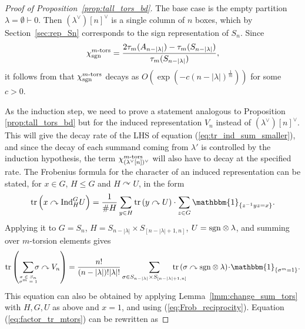 \documentclass{amsart}
\newcommand{\tn}{\textnormal}
\newcommand{\tr}{\operatorname{tr}}
\begin{document}
\begin{proof}[Proof of Proposition~\ref{prop:tall_tors_bd}]
The base case is the empty partition $\lambda=\emptyset\vdash0$. Then $(\lambda^\vee)[n]^\vee$ is a single column of $n$ boxes, which by Section~\ref{sec:rep_Sn} corresponds to the sign representation of $S_n$. Since
\begin{equation}\label{eq:sgn_mtors}
\chi_\tn{sgn}^{m\tn{-tors}}=\frac{2\tau_m(A_{n-|\lambda|})-\tau_m(S_{n-|\lambda|})}{\tau_m(S_{n-|\lambda|})},
\end{equation}
it follows from \cite[Lemma 2.18]{fuchsian_gps_coverings_Riemann_surfaces_subgp_growth_random_quots_walks_LiebeckShalev04} that $\chi^{m\tn{-tors}}_\tn{sgn}$ decays as $O(\exp(-c(n-|\lambda|)^{\frac{1}{m}}))$ for some $c>0$.

As the induction step, we need to prove a statement analogous to Proposition \ref{prop:tall_tors_bd} but for the induced representation $V_n$ instead of $(\lambda^\vee)[n]^\vee$. This will give the decay rate of the LHS of equation (\ref{eq:tr_ind_sum_smaller}), and since the decay of each summand coming from $\lambda'$ is controlled by the induction hypothesis, the term $\chi^{m\tn{-tors}}_{(\lambda^\vee[n])^\vee}$ will also have to decay at the specified rate. The Frobenius formula for the character of an induced representation can be stated, for $x\in G$, $H\leq G$ and $H\curvearrowright U$, in the form
\begin{equation*}
\tr\left(x\curvearrowright\tn{Ind}^G_HU\right)=\frac{1}{\#H}\sum_{y\in H}\tr\left(y\curvearrowright U\right)\cdot\sum_{z\in G}\mathbbm{1}_{\{z^{-1}yz=x\}}.
\end{equation*}
Applying it to $G=S_n$, $H=S_{n-|\lambda|}\times S_{[n-|\lambda|+1,n]}$, $U=\tn{sgn}\otimes\lambda$, and summing over $m$-torsion elements gives
\begin{equation}\label{eq:factor_tr_mtors}
\tr\left(\sum_{\tiny\begin{matrix}\sigma\in S_n\\\sigma^m=1\end{matrix}}\hspace*{-5pt}\sigma\curvearrowright V_n\right)=\frac{n!}{(n-|\lambda|)!|\lambda|!}\sum_{\tiny\sigma\in S_{n-|\lambda|}\times S_{[n-|\lambda|+1,n]}}\hspace*{-20pt}\tr\left(\sigma\curvearrowright\tn{sgn}\otimes\lambda\right)\!\cdot\!\mathbbm{1}_{\{\sigma^m=1\}}.
\end{equation}
This equation can also be obtained by applying Lemma~\ref{lmm:change_sum_tors} with $H,G,U$ as above and $x=1$, and using (\ref{eq:Frob_reciprocity}). Equation (\ref{eq:factor_tr_mtors}) can be rewritten as

\end{proof}
\end{document}
